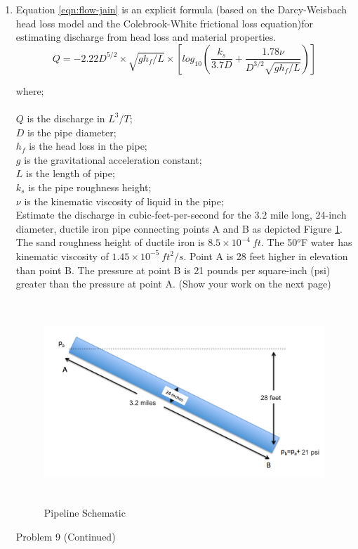 \documentclass[11pt]{article}
\newcommand\tab[1][1cm]{\hspace*{#1}}
\begin{document}
\begin{enumerate}
\begin{enumerate}[(a)]
\end{enumerate}


\clearpage
\item 
Equation \ref{eqn:flow-jain} is an explicit formula (based on the Darcy-Weisbach head loss model and the Colebrook-White frictional loss equation)for estimating discharge from head loss and material properties. %
\begin{equation}
Q=-2.22D^{5/2} \times \sqrt{gh_f/L}\times[log_{10} (\frac{k_s}{3.7D} + \frac{1.78\nu}{D^{3/2}\sqrt{gh_f/L}} )]
\label{eqn:flow-jain}
\end{equation}

where;\\~\\
\tab $Q$ is the discharge in $L^3/T$;\\
\tab $D$ is the pipe diameter; \\
\tab $h_f$ is the head loss in the pipe; \\
\tab $g$ is the gravitational acceleration constant; \\
\tab $L$ is the length of pipe; \\
\tab $k_s$ is the pipe roughness height; \\
\tab $\nu$ is the kinematic viscosity of liquid in the pipe; \\ 

Estimate the discharge in cubic-feet-per-second for the 3.2 mile long, 24-inch diameter, ductile iron pipe connecting points A and B as depicted Figure \ref{fig:PipePressureProblem}.
The sand roughness height of ductile iron is $8.5\times10^{-4}~ft$.
The 50$^o$F water has kinematic viscosity of $1.45\times10^{-5}~ft^2/s$.
Point A is 28 feet higher in elevation than point B.  The pressure at point B is 21 pounds per square-inch (psi) greater than the pressure at point A.
(Show your work on the next page)

\begin{figure}[h!] %
   \centering
   \includegraphics[height=3in]{PipePressureProblem.jpg} 
   \caption{Pipeline Schematic}
   \label{fig:PipePressureProblem}
\end{figure}
\clearpage
Problem 9 (Continued)\\
~\newline



\end{enumerate}
\end{document}
